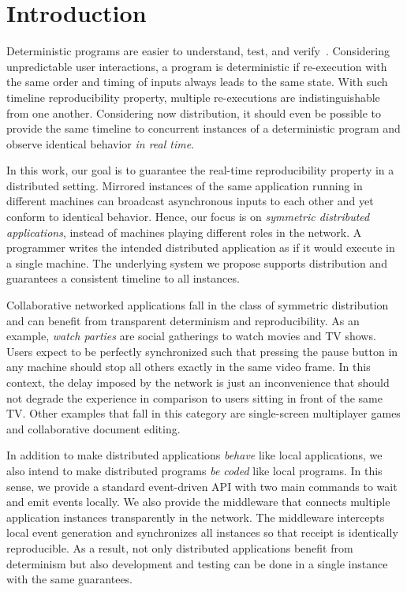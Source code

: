 \documentclass[sigplan,screen]{acmart}
\begin{document}
\section{Introduction}

Deterministic programs are easier to understand, test, and verify~\cite{det}.
Considering unpredictable user interactions, a program is deterministic if
re-execution with the same order and timing of inputs always leads to the same
state.
With such timeline reproducibility property, multiple re-executions are
indistinguishable from one another.
Considering now distribution, it should even be possible to provide the same
timeline to concurrent instances of a deterministic program and observe
identical behavior \emph{in real time}.

In this work, our goal is to guarantee the real-time reproducibility property
in a distributed setting.
Mirrored instances of the same application running in different machines can
broadcast asynchronous inputs to each other and yet conform to
identical behavior.
Hence, our focus is on \emph{symmetric distributed applications}, instead of
machines playing different roles in the network.
A programmer writes the intended distributed application as if it would execute
in a single machine.
The underlying system we propose supports distribution and guarantees a
consistent timeline to all instances.

Collaborative networked applications fall in the class of symmetric
distribution and can benefit from transparent determinism and reproducibility.
As an example, \emph{watch parties} are social gatherings to watch movies and
TV shows.
Users expect to be perfectly synchronized such that pressing the pause button
in any machine should stop all others exactly in the same video frame.
In this context, the delay imposed by the network is just an inconvenience that
should not degrade the experience in comparison to users sitting in front of
the same TV.
Other examples that fall in this category are single-screen multiplayer games
and collaborative document editing.

In addition to make distributed applications \emph{behave} like local
applications, we also intend to make distributed programs \emph{be coded} like
local programs.
In this sense, we provide a standard event-driven API with two main commands
to wait and emit events locally.
We also provide the middleware that connects multiple application instances
transparently in the network.
The middleware intercepts local event generation and synchronizes all instances
so that receipt is identically reproducible.
As a result, not only distributed applications benefit from determinism but
also development and testing can be done in a single instance with the same
guarantees.
\end{document}
